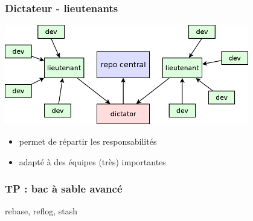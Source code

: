 \begin{frame}\frametitle{Dictateur - lieutenants}
  \begin{center}
    \includegraphics[width=0.8\textwidth]{./images/dictator.png}
  \end{center}
  \begin{itemize}
    \item permet de répartir les responsabilités
    \item adapté à des équipes (très) importantes
  \end{itemize}
\end{frame}

\begin{frame}\frametitle{TP : bac à sable avancé}
  rebase, reflog, stash
\end{frame}

